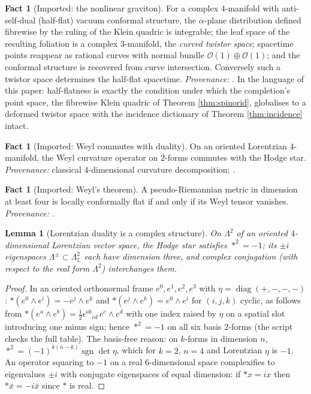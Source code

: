 \documentclass[11pt]{article}
\newtheorem{lemma}[theorem]{Lemma}
\theoremstyle{definition}
\newtheorem{fact}[theorem]{Fact}
\newcommand{\C}{\mathbb{C}}
\begin{document}
\begin{fact}[Imported: the nonlinear graviton]\label{fact:graviton}
For a complex $4$-manifold with anti-self-dual (half-flat) vacuum conformal structure, the $\alpha$-plane distribution defined fibrewise by the ruling of the Klein quadric is integrable; the leaf space of the resulting foliation is a complex $3$-manifold, the \emph{curved twistor space}; spacetime points reappear as rational curves with normal bundle $\mathcal{O}(1)\oplus\mathcal{O}(1)$; and the conformal structure is recovered from curve intersection. Conversely such a twistor space determines the half-flat spacetime. \emph{Provenance:} \cite{Penrose76}. In the language of this paper: half-flatness is exactly the condition under which the completion's point space, the fibrewise Klein quadric of Theorem \ref{thm:spinorid}, globalises to a deformed twistor space with the incidence dictionary of Theorem \ref{thm:incidence} intact.
\end{fact}

\begin{fact}[Imported: Weyl commutes with duality]\label{fact:weylstar}
On an oriented Lorentzian $4$-manifold, the Weyl curvature operator on $2$-forms commutes with the Hodge star. \emph{Provenance:} classical $4$-dimensional curvature decomposition; \cite{PenroseRindler86}.
\end{fact}

\begin{fact}[Imported: Weyl's theorem]\label{fact:weyl}
A pseudo-Riemannian metric in dimension at least four is locally conformally flat if and only if its Weyl tensor vanishes. \emph{Provenance:} \cite{Weyl1918}.
\end{fact}

\begin{lemma}[Lorentzian duality is a complex structure]\label{lem:star}
On $\Lambda^2$ of an oriented $4$-dimensional Lorentzian vector space, the Hodge star satisfies $\ast^2 = -1$; its $\pm i$ eigenspaces $\Lambda^\pm \subset \Lambda^2_\C$ each have dimension three, and complex conjugation (with respect to the real form $\Lambda^2$) interchanges them.
\end{lemma}

\begin{proof}
In an oriented orthonormal frame $e^0, e^1, e^2, e^3$ with $\eta = \operatorname{diag}(+,-,-,-)$: $\ast(e^0\wedge e^i) = -e^j\wedge e^k$ and $\ast(e^j\wedge e^k) = e^0\wedge e^i$ for $(i,j,k)$ cyclic, as follows from $\ast(e^a\wedge e^b) = \tfrac12\epsilon^{ab}{}_{cd}\,e^c\wedge e^d$ with one index raised by $\eta$ on a spatial slot introducing one minus sign; hence $\ast^2 = -1$ on all six basis $2$-forms (the script checks the full table). The basis-free reason: on $k$-forms in dimension $n$, $\ast^2 = (-1)^{k(n-k)}\operatorname{sgn}\det\eta$, which for $k = 2$, $n = 4$ and Lorentzian $\eta$ is $-1$. An operator squaring to $-1$ on a real $6$-dimensional space complexifies to eigenvalues $\pm i$ with conjugate eigenspaces of equal dimension: if $\ast x = ix$ then $\ast \bar x = -i\bar x$ since $\ast$ is real.
\end{proof}
\end{document}
